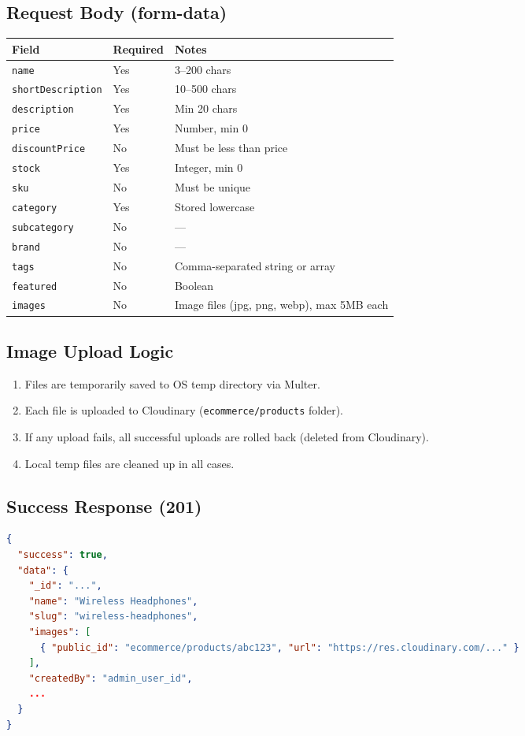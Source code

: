\subsection*{Request Body (form-data)}
\begin{longtable}{@{}llp{7cm}@{}}
  \toprule
  \textbf{Field} & \textbf{Required} & \textbf{Notes} \\
  \midrule
  \texttt{name}             & Yes & 3--200 chars \\
  \texttt{shortDescription} & Yes & 10--500 chars \\
  \texttt{description}      & Yes & Min 20 chars \\
  \texttt{price}            & Yes & Number, min 0 \\
  \texttt{discountPrice}    & No  & Must be less than price \\
  \texttt{stock}            & Yes & Integer, min 0 \\
  \texttt{sku}              & No  & Must be unique \\
  \texttt{category}         & Yes & Stored lowercase \\
  \texttt{subcategory}      & No  & --- \\
  \texttt{brand}            & No  & --- \\
  \texttt{tags}             & No  & Comma-separated string or array \\
  \texttt{featured}         & No  & Boolean \\
  \texttt{images}           & No  & Image files (jpg, png, webp), max 5MB each \\
  \bottomrule
\end{longtable}

\subsection*{Image Upload Logic}
\begin{enumerate}
  \item Files are temporarily saved to OS temp directory via Multer.
  \item Each file is uploaded to Cloudinary (\texttt{ecommerce/products} folder).
  \item If any upload fails, all successful uploads are rolled back (deleted from Cloudinary).
  \item Local temp files are cleaned up in all cases.
\end{enumerate}

\subsection*{Success Response (201)}
\begin{lstlisting}[language=json]
{
  "success": true,
  "data": {
    "_id": "...",
    "name": "Wireless Headphones",
    "slug": "wireless-headphones",
    "images": [
      { "public_id": "ecommerce/products/abc123", "url": "https://res.cloudinary.com/..." }
    ],
    "createdBy": "admin_user_id",
    ...
  }
}
\end{lstlisting}

